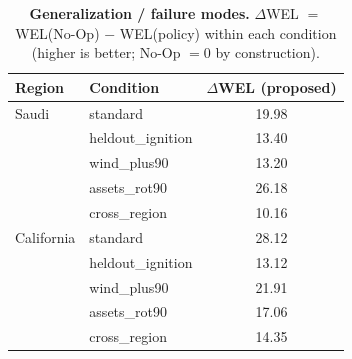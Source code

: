 \begin{table}[t]
\centering
\caption{\textbf{Generalization / failure modes.} $\Delta$WEL $=$ WEL(No-Op) $-$ WEL(policy) within each condition (higher is better; No-Op $=0$ by construction).}
\label{tab:generalization}
\begin{tabular}{llc}
\toprule
Region & Condition & $\Delta$WEL (proposed) \\
\midrule
Saudi & standard & 19.98 \\
 & heldout\_ignition & 13.40 \\
 & wind\_plus90 & 13.20 \\
 & assets\_rot90 & 26.18 \\
 & cross\_region & 10.16 \\
\midrule
California & standard & 28.12 \\
 & heldout\_ignition & 13.12 \\
 & wind\_plus90 & 21.91 \\
 & assets\_rot90 & 17.06 \\
 & cross\_region & 14.35 \\
\bottomrule
\end{tabular}
\end{table}
